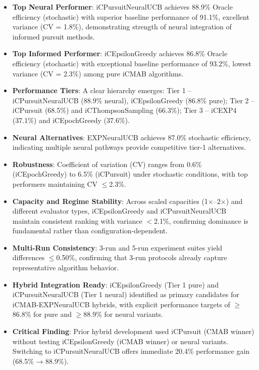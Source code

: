 \documentclass[12pt,a4paper]{article}
\newcommand{\primarytext}[1]{\textcolor{primaryblue}{\textbf{#1}}}
\newcommand{\secondarytext}[1]{\textcolor{secondaryblue}{\textbf{#1}}}
\newcommand{\success}[1]{\textcolor{accentgreen}{\textbf{#1}}}
\newcommand{\warning}[1]{\textcolor{warningred}{\textbf{#1}}}
\newcommand{\legacy}[1]{\textcolor{legacycolor}{\textbf{#1}}}
\newcommand{\neural}[1]{\textcolor{neuralcolor}{\textbf{#1}}}
\begin{document}
\begin{tcolorbox}[colback=highlightgray,colframe=primaryblue,title=\textbf{Executive Summary}]
\begin{itemize}
\item \neural{Top Neural Performer}: iCPursuitNeuralUCB achieves 88.9\% Oracle efficiency (stochastic) with superior baseline performance of 91.1\%, excellent variance (CV = 1.8\%), demonstrating strength of neural integration of informed pursuit methods.
\item \primarytext{Top Informed Performer}: iCEpsilonGreedy achieves 86.8\% Oracle efficiency (stochastic) with exceptional baseline performance of 93.2\%, lowest variance (CV = 2.3\%) among pure iCMAB algorithms.
\item \secondarytext{Performance Tiers}: A clear hierarchy emerges: Tier 1 -- iCPursuitNeuralUCB (88.9\% neural), iCEpsilonGreedy (86.8\% pure); Tier 2 -- iCPursuit (68.5\%) and iCThompsonSampling (66.3\%); Tier 3 -- iCEXP4 (37.1\%) and iCEpochGreedy (37.6\%).
\item \legacy{Neural Alternatives}: EXPNeuralUCB achieves 87.0\% stochastic efficiency, indicating multiple neural pathways provide competitive tier-1 alternatives.
\item \success{Robustness}: Coefficient of variation (CV) ranges from 0.6\% (iCEpochGreedy) to 6.5\% (iCPursuit) under stochastic conditions, with top performers maintaining CV $\leq$2.3\%.
\item \success{Capacity and Regime Stability}: Across scaled capacities (1$\times$--2$\times$) and different evaluator types, iCEpsilonGreedy and iCPursuitNeuralUCB maintain consistent ranking with variance $<$2.1\%, confirming dominance is fundamental rather than configuration-dependent.
\item \success{Multi-Run Consistency}: 3-run and 5-run experiment suites yield differences $\leq$0.50\%, confirming that 3-run protocols already capture representative algorithm behavior.
\item \primarytext{Hybrid Integration Ready}: iCEpsilonGreedy (Tier 1 pure) and iCPursuitNeuralUCB (Tier 1 neural) identified as primary candidates for iCMAB-EXPNeuralUCB hybrids, with explicit performance targets of $\geq$86.8\% for pure and $\geq$88.9\% for neural variants.
\item \warning{Critical Finding}: Prior hybrid development used iCPursuit (CMAB winner) without testing iCEpsilonGreedy (iCMAB winner) or neural variants. Switching to iCPursuitNeuralUCB offers immediate 20.4\% performance gain (68.5\% → 88.9\%).
\end{itemize}
\end{tcolorbox}
\end{document}
